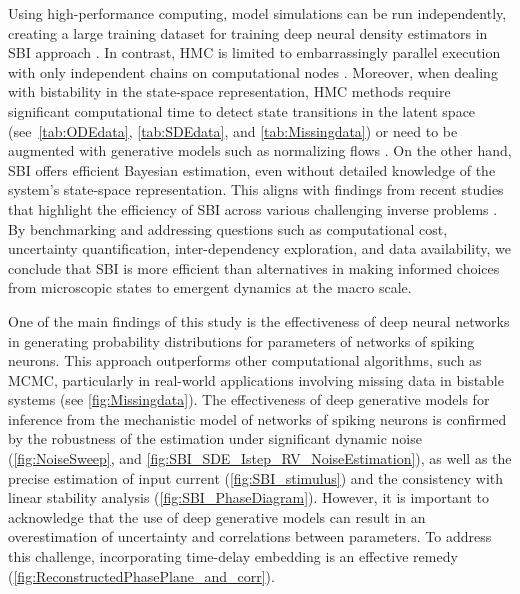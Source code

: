 \documentclass[preprint,11pt,authoryear]{elsarticle}
\begin{document}
Using high-performance computing, model simulations can be run independently, creating a large training dataset for training deep neural density estimators in SBI approach \citep{Hashemi2023}. In contrast, HMC is limited to embarrassingly parallel execution with only independent chains on computational nodes \citep{Hashemi2021}. Moreover, when dealing with bistability in the state-space representation, HMC methods require significant computational time to detect state transitions in the latent space (see~\autoref{tab:ODEdata}, \autoref{tab:SDEdata}, and \autoref{tab:Missingdata}) or need to be augmented with generative models such as normalizing flows \citep{Hoffman2019, Gabrie2022}. On the other hand, SBI offers efficient Bayesian estimation, even without detailed knowledge of the system's state-space representation. This aligns with findings from recent studies that highlight the efficiency of SBI across various challenging inverse problems \citep{Goncalves2020, Deistler2022, Boelts2022, Boelts2023, Hashemi2023, Lavanga2023, Yalccinkaya2023, Rabuffo2023, Sorrentino2023}. By benchmarking and addressing questions such as computational cost, uncertainty quantification, inter-dependency exploration, and data availability, we conclude that SBI is more efficient than alternatives in making informed choices from microscopic states to emergent dynamics at the macro scale. 


One of the main findings of this study is the effectiveness of deep neural networks in generating probability distributions for parameters of networks of spiking neurons. This approach outperforms other computational algorithms, such as MCMC, particularly in real-world applications involving missing data in bistable systems (see \autoref{fig:Missingdata}). The effectiveness of deep generative models for inference from the mechanistic model of networks of spiking neurons is confirmed by the robustness of the estimation under significant dynamic noise (\autoref{fig:NoiseSweep}, and \autoref{fig:SBI_SDE_Istep_RV_NoiseEstimation}), as well as the precise estimation of input current (\autoref{fig:SBI_stimulus}) and the consistency with linear stability analysis (\autoref{fig:SBI_PhaseDiagram}). However, it is important to acknowledge that the use of deep generative models can result in an overestimation of uncertainty and correlations between parameters. To address this challenge, incorporating time-delay embedding is an effective remedy (\autoref{fig:ReconstructedPhasePlane_and_corr}). 
\end{document}
